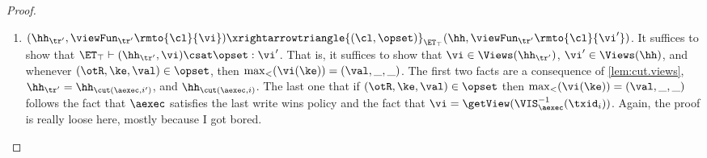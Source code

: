 \begin{proof}
\begin{itemize}
\begin{enumerate}
\begin{itemize}
\item There exists an index $j : 1 \leq j \leq i'$ and an integer $h \in \Nat$ such that $\txid_{j} = \txid_{\cl}^{h}$. 
Without loss of generality, let $j$ be the largest such index. 
It follows that the last transition in $\tr'$ of the form $(\_, \_) \xrightarrow{(\cl, \opset_{j})} (\_, \viewFun_{\mathsf{pre}})$ 
is such that $\viewFun_{\mathsf{pre}}(\cl) = \getView(\aexec, \T_{\mathsf{pre}})$, 
for some $\T_{\mathsf{pre}} \subseteq \VIS^{-1}_{\aexec}(\txid_{i}) \cap (\AR^{-1}_{\aexec})?(\txid_{j})$.
This is because $\nextTx(\cl, \aexec, j)$  is defined and equal to $\txid_{i}$. 
Furthermore, because the trace $\tr'$ is in normal form by construction, 
in $\tr'$ a transition of the form $(\_, \_) \xrightarrowtriangle{(\cl, \varepsilon)}_{\ET_{\top}} (\_, \_)$ 
is always followed by a transition of the form $(\_, \_) \xrightarrowtriangle{(\cl, \opset')}_{\ET_{\top}} (\_, \_)$. 
Because we assume that the last transition where client $\cl$ executes a transaction in $\tr'$ 
has the form $(\_, \_) \xrightarrowtriangle{(\cl, \opset_{j})}_{\ET_{\top}} (\_, \viewFun_{\mathsf{pre}})$, 
then the latter is also the last transition for client $\cl$ in $\tr'$ 
(i.e. including both execution of transactions and view updates). 
It follows that $\viewFun_{\tr'}(\cl) = \viewFun_{\mathsf{pre}}(\cl)$, and in particular 
$\viewFun_{\tr'}(\cl) = \getView(\aexec, \T_{\mathsf{pre}})$. By definition, 
$\T_{\mathsf{pre}} \subseteq  \VIS^{-1}_{\aexec}(\txid_{i}) \cap (\AR^{-1}_{\aexec})?(\txid_{j}) 
\subseteq \VIS^{-1}_{\aexec}(\txid_{i})$. By  \cref{lem:getView.monotone}, 
we have that $\viewFun_{\tr'}(\cl) = \getView(\aexec, \T_{\mathsf{pre}}) \viewleq 
\getView(\aexec, \VIS^{-1}_{\aexec}(\txid_{i})) = \vi$, as we wanted to prove.
\ac{Note: this is more a sketch, rather than a real proof. A Proposition giving an explicit form to the 
structure of any $\tr \in \KVtrace(\ET_{\top}, \aexec)$ would be helpful for a more rigorous proof here.}
\end{itemize}


\item $(\hh_{\tr'}, \viewFun_{\tr'}\rmto{\cl}{\vi}) \xrightarrowtriangle{(\cl, \opset)}_{\ET_{\top}} (\hh,  \viewFun_{\tr'}\rmto{\cl}{\vi'})$. 
It suffices to show that $\ET_{\top} \vdash (\hh_{\tr'}, \vi) \csat \opset: \vi'$. 
That is, it suffices to show that $\vi \in \Views(\hh_{\tr'})$, $\vi' \in \Views(\hh)$, 
and whenever $(\otR, \ke, \val) \in \opset$, then $\max_{<}(\vi(\ke)) = (\val, \_, \_)$. 
The first two facts are a consequence of \cref{lem:cut.views}, $\hh_{\tr'} = \hh_{\cut(\aexec, i')}$, and  $\hh_{\cut(\aexec, i)}$. 
The last one that if $(\otR, \ke, \val) \in \opset$ then $\max_{<}(\vi(\ke)) = (\val, \_, \_)$ follows the fact that 
$\aexec$ satisfies the last write wins policy and the fact that $\vi = \getView(\VIS^{-1}_{\aexec}(\txid_{i}))$.
\ac{Again, the proof is really loose here, mostly because I got bored.}
\end{enumerate} 

\end{itemize}
\end{proof}

